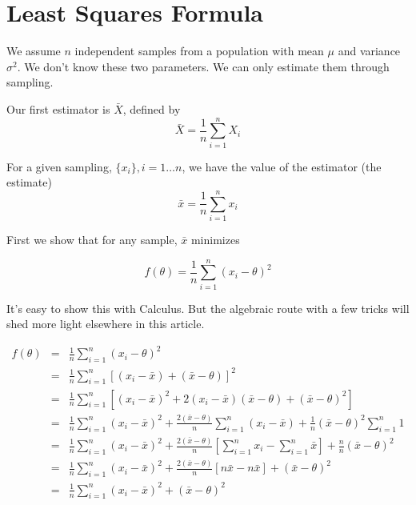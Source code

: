 \documentclass[]{article}
\begin{document}
\appendix

\section{Least Squares Formula} \label{sec:least_squares_formula}

We assume $n$ independent samples from a population with
mean $\mu$ and variance $\sigma^2$.  We don't know these
two parameters.  We can only estimate them through sampling.

Our first estimator is $\bar{X}$, defined by
\begin{equation}
\bar{X} = \frac{1}{n} \sum_{i=1}^n X_i
\end{equation}

For a given sampling, $\{x_i\}, i=1 \ldots n$, we have the
value of the estimator (the estimate)
$$
\bar{x} = \frac{1}{n} \sum_{i=1}^n x_i
$$

First we show that for any sample, $\bar{x}$ minimizes

\begin{equation} \label{least_squares}
f(\theta) = \frac{1}{n} \sum_{i=1}^n (x_i - \theta)^2
\end{equation}

It's easy to show this with Calculus.  But the algebraic
route with a few tricks will shed more light elsewhere in
this article.

\begin{eqnarray}
f(\theta) &= &\frac{1}{n} \sum_{i=1}^n (x_i - \theta)^2 \nonumber \\
  &= &\frac{1}{n} \sum_{i=1}^n \left[ (x_i - \bar{x}) + (\bar{x} - \theta)\right]^2 \nonumber \\
  &= &\frac{1}{n} \sum_{i=1}^n \left[ (x_i - \bar{x})^2 + 2 (x_i-\bar{x})(\bar{x} - \theta) + (\bar{x} - \theta)^2 \right] \nonumber \\
  &= &\frac{1}{n} \sum_{i=1}^n (x_i - \bar{x})^2 + 
     \frac{2(\bar{x} - \theta)}{n} \sum_{i=1}^n (x_i - \bar{x}) +
     \frac{1}{n} (\bar{x} - \theta)^2 \sum_{i=1}^n 1 \nonumber \\
  &= &\frac{1}{n} \sum_{i=1}^n (x_i - \bar{x})^2 + 
     \frac{2(\bar{x} - \theta)}{n} \left[ \sum_{i=1}^n x_i - \sum_{i=1}^n  \bar{x} \right]  +
     \frac{n}{n} (\bar{x} - \theta)^2 \nonumber \\
  &= &\frac{1}{n} \sum_{i=1}^n (x_i - \bar{x})^2 + 
     \frac{2(\bar{x} - \theta)}{n} \left[ n \bar{x} - n \bar{x} \right]  +
     (\bar{x} - \theta)^2 \nonumber \\
  &= &\frac{1}{n} \sum_{i=1}^n (x_i - \bar{x})^2 + 
     (\bar{x} - \theta)^2 \label{least_square_residue}
\end{eqnarray}
\end{document}

